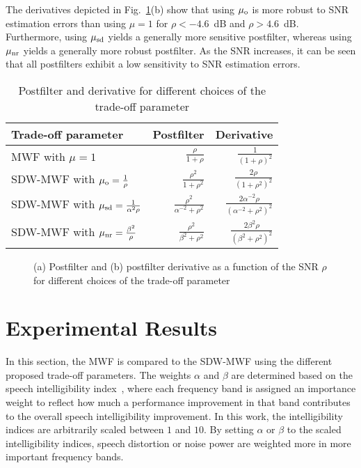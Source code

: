 \documentclass[10pt]{IEEEtran}
\begin{document}
The derivatives depicted in Fig.~\ref{fig: gain}(b) show that using $\mu_{\rm o}$ is more robust to SNR estimation errors than using $\mu = 1$ for $\rho < -4.6$~dB and $\rho > 4.6$~dB.
Furthermore, using $\mu_{\rm sd}$ yields a generally more sensitive postfilter, whereas using $\mu_{\rm nr}$ yields a generally more robust postfilter.
As the SNR increases, it can be seen that all postfilters exhibit a low sensitivity to SNR estimation errors. 
\begin{table}[b!]
\begin{center}
  \caption{Postfilter and derivative for different choices of the trade-off parameter}
  \label{tbl: postfilters}
  \begin{tabularx}{\linewidth}{Xrr}
    \toprule
    Trade-off parameter & Postfilter  & Derivative\\
    \midrule
    MWF with $\mu = 1$ & $\frac{\rho}{1+\rho}$ & $\frac{1}{(1+\rho)^2}$ \\
    SDW-MWF with $\mu_{\rm o} = \frac{1}{\rho}$ & $\frac{\rho^2}{1+\rho^2}$ & $\frac{2 \rho}{(1+\rho^2)^2}$ \\
    SDW-MWF with $\mu_{\rm sd} = \frac{1}{\alpha^2 \rho}$ & $\frac{\rho^2}{\alpha^{-2}+\rho^2}$ & $\frac{2 \alpha^{-2} \rho}{(\alpha^{-2}+\rho^2)^2}$ \\
    SDW-MWF with $\mu_{\rm nr} = \frac{\beta^2}{\rho}$ & $\frac{\rho^2}{\beta^{2}+\rho^2}$ & $\frac{2 \beta^{2} \rho}{(\beta^{2}+\rho^2)^2}$ \\
    \bottomrule
  \end{tabularx}
\end{center}
\end{table}
\begin{figure}[t]
  \centering
  
  \caption{(a) Postfilter and (b) postfilter derivative as a function of the SNR $\rho$ for different choices of the trade-off parameter}
  \label{fig: gain}
\end{figure} 

\section{Experimental Results}
\label{sec: exp}
In this section, the MWF is compared to the SDW-MWF using the different proposed trade-off parameters. 
The weights $\alpha$ and $\beta$ are determined based on the speech intelligibility index~\cite{ASA}, where each frequency band is assigned an importance weight to reflect how much a performance improvement in that band contributes to the overall speech intelligibility improvement. 
In this work, the intelligibility indices are arbitrarily scaled between $1$ and $10$.
By setting $\alpha$ or $\beta$ to the scaled intelligibility indices, speech distortion or noise power are weighted more in more important frequency bands.
\end{document}
